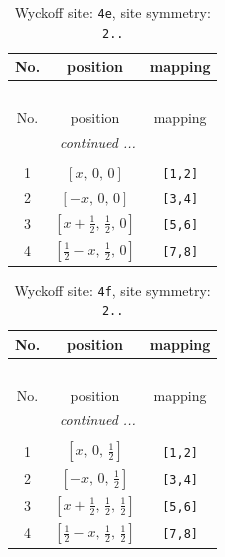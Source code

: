 \documentclass[fleqn,8pt]{jsarticle}
\begin{document}
\begin{longtable}{ccc}
\caption{Wyckoff site: {\tt 4e}, site symmetry: {\tt 2..}}
 \\
 \hline \hline
No. & position & mapping \\ \hline \endfirsthead

\multicolumn{2}{l}{\tablename\ \thetable{}} \\
 \hline \hline
No. & position & mapping \\ \hline \endhead

 \hline \hline
\multicolumn{2}{r}{\footnotesize\it continued ...} \\ \endfoot

 \hline \hline
\multicolumn{2}{r}{} \\ \endlastfoot

1 & $\left[ x,\, 0,\, 0 \right]$ & {\tt [1,2]} \\ \hline
2 & $\left[ - x,\, 0,\, 0 \right]$ & {\tt [3,4]} \\ \hline
3 & $\left[ x + \frac{1}{2},\, \frac{1}{2},\, 0 \right]$ & {\tt [5,6]} \\ \hline
4 & $\left[ \frac{1}{2} - x,\, \frac{1}{2},\, 0 \right]$ & {\tt [7,8]} \\
\end{longtable}
\renewcommand{\arraystretch}{1.2}
\begin{longtable}{ccc}
\caption{Wyckoff site: {\tt 4f}, site symmetry: {\tt 2..}}
 \\
 \hline \hline
No. & position & mapping \\ \hline \endfirsthead

\multicolumn{2}{l}{\tablename\ \thetable{}} \\
 \hline \hline
No. & position & mapping \\ \hline \endhead

 \hline \hline
\multicolumn{2}{r}{\footnotesize\it continued ...} \\ \endfoot

 \hline \hline
\multicolumn{2}{r}{} \\ \endlastfoot

1 & $\left[ x,\, 0,\, \frac{1}{2} \right]$ & {\tt [1,2]} \\ \hline
2 & $\left[ - x,\, 0,\, \frac{1}{2} \right]$ & {\tt [3,4]} \\ \hline
3 & $\left[ x + \frac{1}{2},\, \frac{1}{2},\, \frac{1}{2} \right]$ & {\tt [5,6]} \\ \hline
4 & $\left[ \frac{1}{2} - x,\, \frac{1}{2},\, \frac{1}{2} \right]$ & {\tt [7,8]} \\
\end{longtable}
\end{document}
